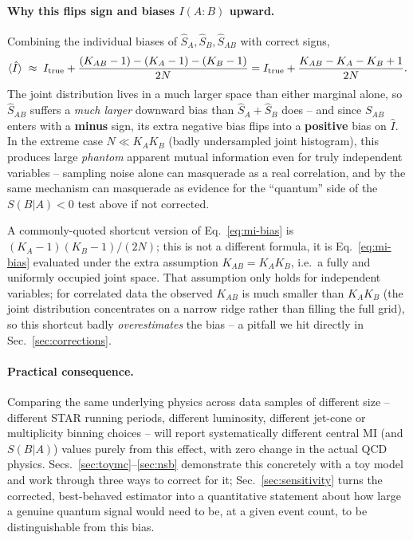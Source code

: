 \documentclass[11pt]{article}
\newcommand{\SBA}{S(B|A)}
\newcommand{\Itrue}{I_{\rm true}}
\begin{document}
\paragraph{Why this flips sign and biases $I(A{:}B)$ upward.} Combining
the individual biases of $\hat S_A,\hat S_B,\hat S_{AB}$ with correct
signs,
\begin{equation}
\langle\hat I\rangle \;\approx\; \Itrue +
\frac{(K_{AB}-1)-(K_A-1)-(K_B-1)}{2N}
= \Itrue + \frac{K_{AB}-K_A-K_B+1}{2N}.
\label{eq:mi-bias}
\end{equation}
The joint distribution lives in a much larger space than either marginal
alone, so $\hat S_{AB}$ suffers a \emph{much larger} downward bias than
$\hat S_A+\hat S_B$ does -- and since $S_{AB}$ enters with a
\textbf{minus} sign, its extra negative bias flips into a \textbf{positive}
bias on $\hat I$. In the extreme case $N \ll K_A K_B$ (badly undersampled
joint histogram), this produces large \emph{phantom} apparent mutual
information even for truly independent variables -- sampling noise alone
can masquerade as a real correlation, and by the same mechanism can
masquerade as evidence for the ``quantum'' side of the $\SBA<0$ test above
if not corrected.

A commonly-quoted shortcut version of Eq.~\eqref{eq:mi-bias} is
$(K_A-1)(K_B-1)/(2N)$; this is not a different formula, it is
Eq.~\eqref{eq:mi-bias} evaluated under the extra assumption
$K_{AB}=K_AK_B$, i.e.\ a fully and uniformly occupied joint space. That
assumption only holds for independent variables; for correlated data the
observed $K_{AB}$ is much smaller than $K_AK_B$ (the joint distribution
concentrates on a narrow ridge rather than filling the full grid), so this
shortcut badly \emph{overestimates} the bias -- a pitfall we hit directly
in Sec.~\ref{sec:corrections}.

\paragraph{Practical consequence.} Comparing the same underlying physics
across data samples of different size -- different STAR running periods,
different luminosity, different jet-cone or multiplicity binning choices
-- will report systematically different central MI (and $\SBA$) values
purely from this effect, with zero change in the actual QCD physics.
Secs.~\ref{sec:toymc}--\ref{sec:nsb} demonstrate this concretely with a
toy model and work through three ways to correct for it;
Sec.~\ref{sec:sensitivity} turns the corrected, best-behaved estimator
into a quantitative statement about how large a genuine quantum signal
would need to be, at a given event count, to be distinguishable from this
bias.
\end{document}
